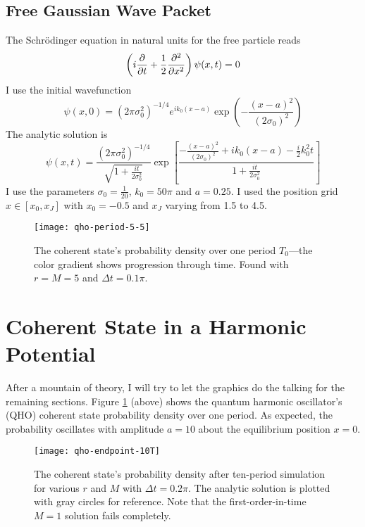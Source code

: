 \documentclass[11pt, a4paper]{article}
\newcommand{\schro}{Schr\"{o}dinger\xspace}
\begin{document}
\subsection{Free Gaussian Wave Packet}
The \schro equation in natural units for the free particle reads
\begin{equation*}
	\left(i \pdv{t} + \frac{1}{2}\pdv[2]{}{x}\right) \psi(x, t) = 0
\end{equation*}
I use the initial wavefunction
\begin{equation*}
	\psi(x, 0) = (2\pi \sigma_{0}^{2})^{-1/4}e^{ik_{0}(x - a)}\exp(-\frac{(x - a)^{2}}{(2\sigma_{0})^{2}})
\end{equation*}
The analytic solution is
\begin{equation*}
	\psi(x, t) = \frac{(2\pi \sigma_{0}^{2})^{-1/4}}{\sqrt{1 + \frac{it}{2\sigma_{0}^{2}}}} \exp \left[\frac{-\frac{(x-a)^{2}}{(2\sigma_{0})^{2}} + ik_{0}(x-a) - \tfrac{i}{2}k_{0}^{2}t}{1 + \frac{it}{2\sigma_{0}^{2}}}\right]
\end{equation*}
I use the parameters $ \sigma_{0} = \frac{1}{20} $, $ k_{0} = 50 \pi $ and $ a = 0.25 $. I used the position grid $ x \in [x_{0}, x_{J}] $ with $ x_{0} = -0.5 $ and $ x_{J} $ varying from 1.5 to 4.5. 



\begin{figure}[htb!]
\centering
\texttt{[image: qho-period-5-5]}
\caption{The coherent state's probability density over one period $ T_{0} $---the color gradient shows progression through time. Found with $ r = M = 5 $ and $ \Delta t = 0.1 \pi $.}
\label{diff:fig:qho-period}
\end{figure}

\section{Coherent State in a Harmonic Potential}  \label{diff:s:coherent}
After a mountain of theory, I will try to let the graphics do the talking for the remaining sections. Figure \ref{diff:fig:qho-period} (above) shows the quantum harmonic oscillator's (QHO) coherent state probability density over one period. As expected, the probability oscillates with amplitude $ a = 10 $ about the equilibrium position $ x = 0 $. 

\begin{figure}[htb!]
\centering
\texttt{[image: qho-endpoint-10T]}
\caption{The coherent state's probability density after ten-period simulation for various $ r $ and $ M $ with $ \Delta t = 0.2 \pi $. The analytic solution is plotted with gray circles for reference. Note that the first-order-in-time $ M=1 $ solution fails completely.}
\label{diff:fig:qho-endpoint}
\end{figure}
\end{document}
